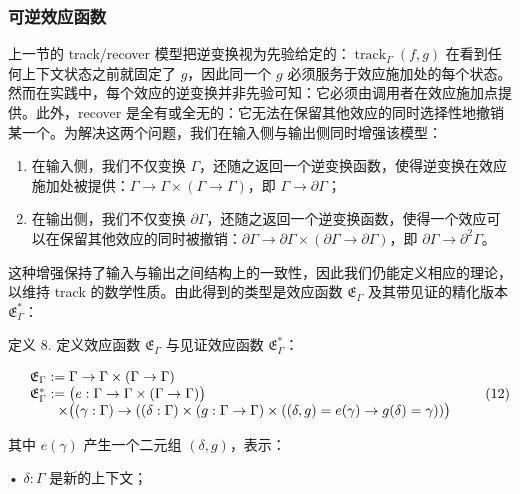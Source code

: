 \documentclass[
  10
]{article}
\begin{document}
\subsubsection{可逆效应函数} \label{revertible-efect-functions}

上一节的 track/recover 模型把逆变换视为先验给定的：\(\operatorname { t r a c k } _ { \Gamma } ( f , g )\) 在看到任何上下文状态之前就固定了 \(g\)，因此同一个 \(g\) 必须服务于效应施加处的每个状态。然而在实践中，每个效应的逆变换并非先验可知：它必须由调用者在效应施加点提供。此外，recover 是全有或全无的：它无法在保留其他效应的同时选择性地撤销某一个。为解决这两个问题，我们在输入侧与输出侧同时增强该模型：

\begin{enumerate}
\def\labelenumi{\arabic{enumi}.}
\item
  在输入侧，我们不仅变换 $\Gamma$，还随之返回一个逆变换函数，使得逆变换在效应施加处被提供：\(\Gamma \to \Gamma \times ( \Gamma \to \Gamma )\)，即
  \(\Gamma \to \partial \Gamma\)；
\item
  在输出侧，我们不仅变换 \(\partial \Gamma\)，还随之返回一个逆变换函数，使得一个效应可以在保留其他效应的同时被撤销：\(\partial \Gamma \to \partial \Gamma \times ( \partial \Gamma \to \partial \Gamma )\)，即
  \(\partial \Gamma \to \partial ^ { 2 } \Gamma\)。
\end{enumerate}

这种增强保持了输入与输出之间结构上的一致性，因此我们仍能定义相应的理论，以维持 track 的数学性质。由此得到的类型是效应函数 \(\mathfrak { E } _ { \Gamma }\) 及其带见证的精化版本
\({ \mathfrak { E } } _ { \Gamma } ^ { * }\)：

定义 8. 定义效应函数 \(\mathfrak { E } _ { \Gamma }\) 与见证效应函数
\({ \mathfrak { E } } _ { \Gamma } ^ { * }\)：

\[
\begin{array} { r l }
  & \mathfrak { E } _ { \Gamma } : = \Gamma \to \Gamma \times ( \Gamma \to \Gamma ) \\
  & \mathfrak { E } _ { \Gamma } ^ { * } : = \big ( e : \Gamma \to \Gamma \times ( \Gamma \to \Gamma ) \big ) \\
  & \quad \quad \times \big ( ( \gamma : \Gamma ) \to ( ( \delta : \Gamma ) \times ( g : \Gamma \to \Gamma ) \times ( ( \delta , g ) = e ( \gamma ) \to g ( \delta ) = \gamma ) ) \big )
\end{array}\tag{12}
\]

其中 \(e ( \gamma )\) 产生一个二元组 \(( \delta , g )\)，表示：

• \(\delta : \Gamma\) 是新的上下文；
\end{document}
